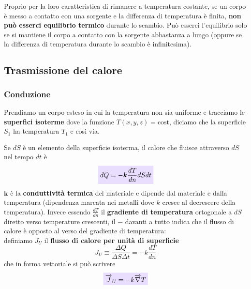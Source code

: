 \documentclass[x11names]{article}
\newcommand{\viola}[1]{\colorbox{yred}{$\displaystyle #1$}}
\begin{document}
	\noindent
	Proprio per la loro caratteristica di rimanere a temperatura costante, se un corpo è messo a contatto con una sorgente e la differenza di temperatura è finita, \textbf{non può esserci equilibrio termico} durante lo scambio. Può esserci l'equilibrio solo se si mantiene il corpo a contatto con la sorgente abbastanza a lungo (oppure se la differenza di temperatura durante lo scambio è infinitesima).
	
	
	\subsection{Trasmissione del calore}
	
	\subsubsection{Conduzione}
	Prendiamo un corpo esteso in cui la temperatura non sia uniforme e tracciamo le \textbf{superfici isoterme} dove la funzione \(T(x,y,z) = \text{cost}\), diciamo che la superficie \(S_1\) ha temperatura \(T_1\) e così via. 
	
	Se \(dS\) è un elemento della superficie isoterma, il calore che fluisce attraverso \(dS\) nel tempo \(dt\) è 
	\begin{equation}\label{fourier calore}
		\viola{dQ = -\boldsymbol{k} \frac{dT}{dn}dS dt}
	\end{equation}
	\(\boldsymbol{k}\) è la \textbf{conduttività termica} del materiale e dipende dal materiale e dalla temperatura (dipendenza marcata nei metalli dove \(k\) cresce al decrescere della temperatura). Invece essendo \(\frac{dT}{dn}\) il \textbf{gradiente di temperatura} ortogonale a \(dS\) diretto verso temperature crescenti, il \(\boldsymbol{-}\) davanti a tutto indica che il flusso di calore è opposto al verso del gradiente di temperatura:\\
	
	\noindent
	definiamo \(J_U\) il \textbf{flusso di calore per unità di superficie} 
	\[ 
	J_U \equiv \frac{\Delta Q}{\Delta S \Delta t} = - k \frac{dT}{dn}
	\]
	che in forma vettoriale si può scrivere
	\begin{equation}
		\viola{\overrightarrow{J}_U = -k \overrightarrow{\nabla}T}
	\end{equation}
	
\end{document}
